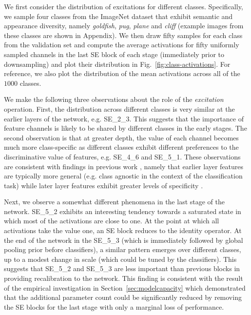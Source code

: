 We first consider the distribution of excitations for different classes. Specifically, we sample four classes from the ImageNet dataset that exhibit semantic and appearance diversity, namely \textit{goldfish}, \textit{pug}, \textit{plane} and \textit{cliff} (example images from these classes are shown in Appendix). We then draw fifty samples for each class from the validation set and compute the average activations for fifty uniformly sampled channels in the last SE block of each stage (immediately prior to downsampling) and plot their distribution in Fig.~\ref{fig:class-activations}. For reference, we also plot the distribution of the mean activations across all of the $1000$ classes.

We make the following three observations about the role of the {\it excitation} operation. First, the distribution across different classes is very similar at the earlier layers of the network, e.g. SE\_2\_3.  This suggests that the importance of feature channels is likely to be shared by different classes in the early stages.  The second observation is that at greater depth, the value of each channel becomes much more \mbox{class-specific} as different classes exhibit different preferences to the discriminative value of features, e.g. SE\_4\_6 and SE\_5\_1.  These observations are consistent with findings in previous work \cite{lee_icml2009cdbn, yosinki_nips2014transfer}, namely that earlier layer features are typically more general (e.g. class agnostic in the context of the classification task) while later layer features exhibit greater levels of specificity \cite{morcos_iclr2018importance}.

Next, we observe a somewhat different phenomena in the last stage of the network. SE\_5\_2 exhibits an interesting tendency towards a saturated state in which most of the activations are close to one. At the point at which all activations take the value one, an SE block reduces to the identity operator. At the end of the network in the SE\_5\_3 (which is immediately followed by global pooling prior before classifiers), a similar pattern emerges over different classes, up to a modest change in scale (which could be tuned by the classifiers).  This suggests that SE\_5\_2 and SE\_5\_3 are less important than previous blocks in providing recalibration to the network.  This finding is consistent with the result of the empirical investigation in Section~\ref{sec:modelcapacity} which demonstrated that the additional parameter count could be significantly reduced by removing the SE blocks for the last stage with only a marginal loss of performance.


